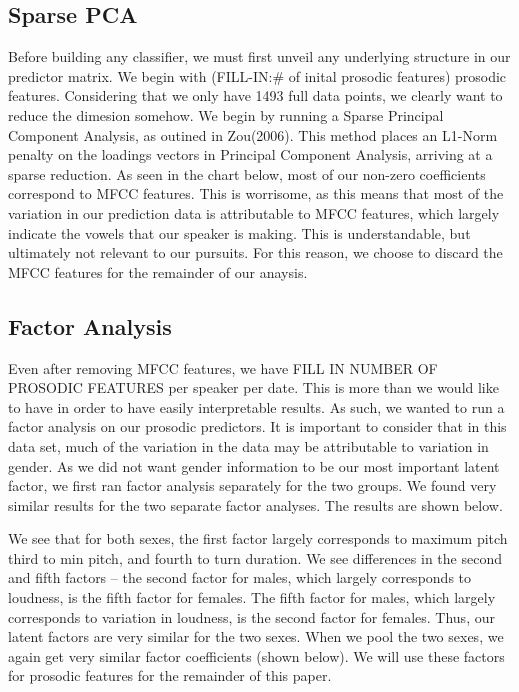\documentclass[11pt]{article}
\begin{document}
\subsection{Sparse PCA}
Before building any classifier, we must first unveil any underlying structure in our predictor matrix.  We begin with (FILL-IN:\# of inital prosodic features) prosodic features.  Considering that we only have 1493 full data points, we clearly want to reduce the dimesion somehow.  We begin by running a Sparse Principal Component Analysis, as outined in Zou(2006).  This method places an L1-Norm penalty on the loadings vectors in Principal Component Analysis, arriving at a sparse reduction.  As seen in the chart below, most of our non-zero coefficients correspond to MFCC features.  This is worrisome, as this means that most of the variation in our prediction data is attributable to MFCC features, which largely indicate the vowels that our speaker is making.  This is understandable, but ultimately not relevant to our pursuits.  For this reason, we choose to discard the MFCC features for the remainder of our anaysis.


\subsection{Factor Analysis}
Even after removing MFCC features, we have FILL IN NUMBER OF PROSODIC FEATURES per speaker per date.  This is more than we would like to have in order to have easily interpretable results.  As such, we wanted to run a factor analysis on our prosodic predictors.  It is important to consider that in this data set, much of the variation in the data may be attributable to variation in gender.  As we did not want gender information to be our most important latent factor, we first ran factor analysis separately for the two groups.  We found very similar results for the two separate factor analyses.  The results are shown below.

We see that for both sexes, the first factor largely corresponds to maximum pitch third to min pitch, and fourth to turn duration.  We see differences in the second and fifth factors -- the second factor for males, which largely corresponds to loudness, is the fifth factor for females.  The fifth factor for males, which largely corresponds to variation in loudness, is the second factor for females.  Thus, our latent factors are very similar for the two sexes.  When we pool the two sexes, we again get very similar factor coefficients (shown below).  We will use these factors for prosodic features for the remainder of this paper.
\end{document}
